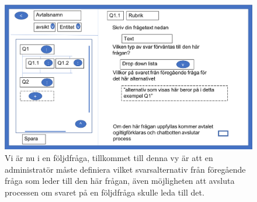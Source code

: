 \documentclass[a4paper,12pt]{article}
\begin{document}
\begin{figure}[H]
    \ContinuedFloat
    \centering
    \includegraphics[width=0.8\linewidth]{img/avtalsskapare_4.png}
    \caption{Vi är nu i en följdfråga, tillkommet till denna vy är att en administratör måste definiera vilket svarsalternativ från föregående fråga som leder till den här frågan, även möjligheten att avsluta processen om svaret på en följdfråga skulle leda till det.}
\end{figure}



\end{document}
